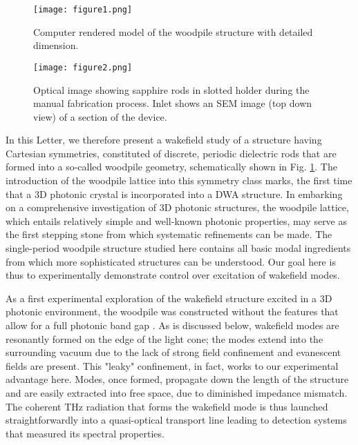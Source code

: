 \documentclass{article}
\begin{document}
\begin{figure}	
\texttt{[image: figure1.png]}
\caption{\label{fig:fig1} Computer rendered model of the woodpile structure with detailed dimension.}
\end{figure}
\begin{figure}
\texttt{[image: figure2.png]}
\caption{\label{fig:fig2}Optical image showing sapphire rods in slotted holder during the manual fabrication process. Inlet shows an SEM image (top down view) of a section of the device.}
\end{figure}

In this Letter, we therefore present a wakefield study of a structure having Cartesian symmetries, constituted of discrete, periodic dielectric rods that are formed into a so-called woodpile geometry, schematically shown in Fig. \ref{fig:fig1}. The introduction of the woodpile lattice into this symmetry class marks, the first time that a 3D photonic crystal is incorporated into a DWA structure. In embarking on a comprehensive investigation of 3D photonic structures, the woodpile lattice, which entails relatively simple and well-known photonic properties, may serve as the first stepping stone from which systematic refinements can be made. The single-period woodpile structure studied here contains all basic modal ingredients from which more sophisticated structures can be understood. Our goal here is thus to experimentally demonstrate control over excitation of wakefield modes.

As a first experimental exploration of the wakefield structure excited in a 3D photonic environment, the woodpile was constructed without the features that allow for a full photonic band gap \cite{Cowan2008,Ho1994}. As is discussed below, wakefield modes are resonantly formed on the edge of the light cone; the modes extend into the surrounding vacuum due to the lack of strong field confinement and evanescent fields are present. This "leaky" confinement, in fact, works to our experimental advantage here. Modes, once formed, propagate down the length of the structure and are easily extracted into free space, due to diminished impedance mismatch. The coherent THz radiation that forms the wakefield mode is thus launched straightforwardly into a quasi-optical transport line leading to detection systems that measured its spectral properties.
\end{document}
